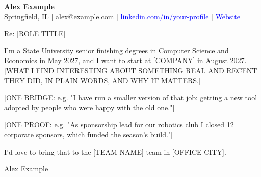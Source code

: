 \documentclass[11pt]{article}
\newcommand{\clicklink}[2]{\href{#1}{\textcolor{blue}{\underline{#2}}}}
\begin{document}
\textbf{\Large Alex Example}\\
Springfield, IL $|$ \href{mailto:alex@example.com}{alex@example.com} $|$ \clicklink{https://www.linkedin.com/in/your-profile/}{linkedin.com/in/your-profile} $|$ \clicklink{https://example.com}{Website}

\vspace{1em}
Re: [ROLE TITLE]

I'm a State University senior finishing degrees in Computer Science and Economics in May 2027, and I want to start at [COMPANY] in August 2027. [WHAT I FIND INTERESTING ABOUT SOMETHING REAL AND RECENT THEY DID, IN PLAIN WORDS, AND WHY IT MATTERS.]

[ONE BRIDGE: e.g. "I have run a smaller version of that job: getting a new tool adopted by people who were happy with the old one."]

[ONE PROOF: e.g. "As sponsorship lead for our robotics club I closed 12 corporate sponsors, which funded the season's build."]

I'd love to bring that to the [TEAM NAME] team in [OFFICE CITY].

Alex Example
\end{document}
